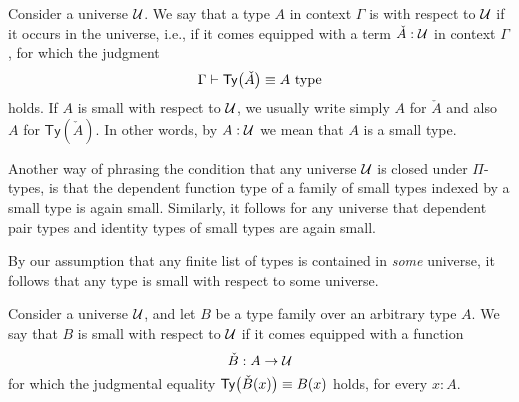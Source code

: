 \begin{defn}
  Consider a universe $\mathcal{U}$. We say that a type $A$ in context $\Gamma$ is  with respect to $\mathcal{U}$ if it occurs in the universe, i.e., if it comes equipped with a term $\check{A}:\mathcal{U}$ in context $\Gamma$, for which the judgment
  \begin{equation*}
    \Gamma\vdash\mathsf{Ty}\big(\check{A}\big)\equiv A~\mathrm{type}
  \end{equation*}
  holds. If $A$ is small with respect to $\mathcal{U}$, we usually write simply $A$ for $\check{A}$ and also $A$ for $\mathsf{Ty}(\check{A})$. In other words, by $A:\mathcal{U}$ we mean that $A$ is a small type. 
\end{defn}

\begin{rmk}
  Another way of phrasing the condition that any universe $\mathcal{U}$ is closed under $\Pi$-types, is that the dependent function type of a family of small types indexed by a small type is again small. Similarly, it follows for any universe that dependent pair types and identity types of small types are again small.

  By our assumption that any finite list of types is contained in \emph{some} universe, it follows that any type is small with respect to some universe.
\end{rmk}

\begin{defn}
  Consider a universe $\mathcal{U}$, and let $B$ be a type family over an arbitrary type $A$. We say that $B$ is small with respect to $\mathcal{U}$ if it comes equipped with a function
  \begin{equation*}
    \check{B}:A\to\mathcal{U}
  \end{equation*}
  for which the judgmental equality $\mathsf{Ty}\big(\check{B}(x)\big)\equiv B(x)$ holds, for every $x:A$.
\end{defn}

